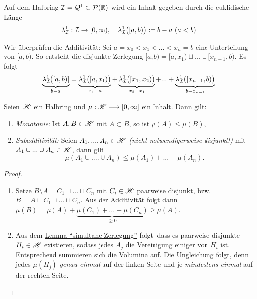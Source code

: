 \begin{example}
\begin{mdframed}
Auf dem Halbring $\mathcal{I} = \mathcal{Q}^1 \subset \mathcal{P}(\mathbb{R})$ wird ein Inhalt gegeben durch die euklidische Länge
\begin{align*} %
\lambda^1_\II : \II \to [0, \infty), \quad \lambda^1_\II \big([a,b)\big) := b-a \ (a<b)
\end{align*}
\end{mdframed}
Wir überprüfen die Additivität: Sei $a = x_0 < x_1 < ... < x_{n} = b$ eine Unterteilung von $[a,b)$. So entsteht die disjunkte Zerlegung $[a,b) = [a,x_1) \sqcup ... \sqcup [x_{n-1},b)$. Es folgt 
\begin{equation*}
\underbrace{\lambda^1_{\mathcal{I}} \big([a,b)]}_{b-a} = \underbrace{\lambda^1_{\mathcal{I}} \big( [a,x_1)\big)}_{x_1-a} + \underbrace{\lambda^1_{\mathcal{I}} \big([x_1,x_2)\big)}_{x_2 -x_1} + ... + \underbrace{\lambda^1_{\mathcal{I}} \big( [x_{n-1},b ) \big)}_{b-x_{n-1}}
\end{equation*}
\end{example}
\begin{lemma}
\begin{mdframed}
Seien $\mathscr{H}$ ein Halbring und $\mu:\mathscr{H} \longrightarrow [0,\infty]$ ein Inhalt. Dann gilt:
\begin{enumerate}[(\roman*),topsep=5pt, itemsep = 0 pt]
	\item \emph{Monotonie}: Ist $A, B \in \mathscr{H}$ mit $A \subset B$, so ist $\mu (A) \leq \mu (B)$,
	\item \emph{Subadditivität:} Seien $A_1, ..., A_n \in \mathscr{H}$ \emph{(nicht notwendigerweise disjunkt!)} mit $A_1 \cup ... \cup A_n \in \mathscr{H}$, dann gilt
	\begin{equation*}
	\mu(A_1 \cup .... \cup A_n) \leq \mu (A_1) + ... + \mu (A_n).
	\end{equation*}
\end{enumerate}
\end{mdframed}
\begin{proof} \
\begin{enumerate}[(\roman*),topsep=5pt, itemsep = 0 pt]
\item Setze $B \setminus A = C_1 \sqcup ... \sqcup C_n$ mit $C_i \in \mathscr{H}$ paarweise disjunkt, bzw. $B= A \sqcup C_1 \sqcup ... \sqcup C_n$. Aus der Additivität folgt dann $\mu(B) = \mu (A) + \underbrace{\mu(C_1) + ... + \mu (C_n)}_{\geq 0} \geq \mu (A)$.
\item Aus dem \hyperref[lemmaA]{Lemma ``simultane Zerlegung''} folgt, dass es paarweise disjunkte $H_i \in \mathscr{H}$ existieren, sodass jedes $A_j$ die Vereinigung einiger von $H_i$ ist. Entsprechend summieren sich die Volumina auf. Die Ungleichung folgt, denn jedes $\mu(H_j)$ \emph{genau einmal} auf der linken Seite und je \emph{mindestens einmal} auf der rechten Seite.
\end{enumerate}
\end{proof}
\end{lemma}

